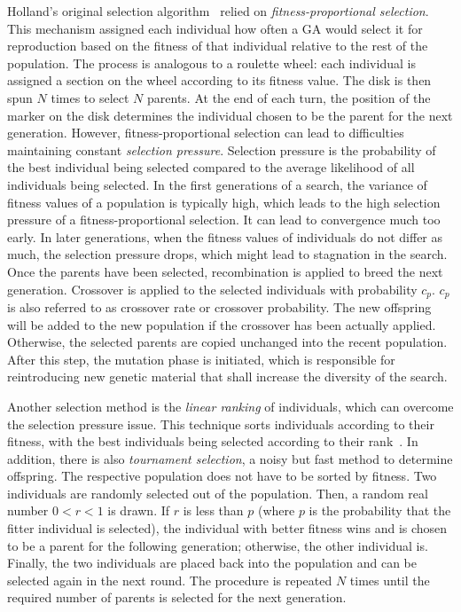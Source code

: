 \documentclass[paper=a4,%
  twoside,%
  BCOR4mm,%
  abstract=true,%
  toc=bibliography,%
  chapterprefix=true,%
  toc=bibliographynumbered,%
  open=right,%
  english,%
  pagesize=pdftex]{scrreprt}
\newcommand{\todo}[1]{\textbf{TODO: #1}}
\begin{document}
Holland's original selection algorithm~\cite{Holland1992} relied on \emph{fitness-proportional selection}. This mechanism assigned each individual how often a \ac{GA} would select it for reproduction based on the fitness of that individual relative to the rest of the population. The process is analogous to a roulette wheel: each individual is assigned a section on the wheel according to its fitness value. The disk is then spun $N$ times to select $N$ parents. At the end of each turn, the position of the marker on the disk determines the individual chosen to be the parent for the next generation. However, fitness-proportional selection can lead to difficulties maintaining constant \emph{selection pressure}. Selection pressure is the probability of the best individual being selected compared to the average likelihood of all individuals being selected. In the first generations of a search, the variance of fitness values of a population is typically high, which leads to the high selection pressure of a fitness-proportional selection. It can lead to convergence much too early. In later generations, when the fitness values of individuals do not differ as much, the selection pressure drops, which might lead to stagnation in the search. Once the parents have been selected, recombination is applied to breed the next generation. Crossover is applied to the selected individuals with probability $c_p$. $c_p$ is also referred to as crossover rate or crossover probability. The new offspring will be added to the new population if the crossover has been actually applied. Otherwise, the selected parents are copied unchanged into the recent population. After this step, the mutation phase is initiated, which is responsible for reintroducing new genetic material that shall increase the diversity of the search.

Another selection method is the \emph{linear ranking} of individuals, which can overcome the selection pressure issue. This technique sorts individuals according to their fitness, with the best individuals being selected according to their rank~\cite{whitley1989genitor}. In addition, there is also \emph{tournament selection}, a noisy but fast method to determine offspring. The respective population does not have to be sorted by fitness. Two individuals are randomly selected out of the population. Then, a random real number $0 < r < 1$ is drawn. If $r$ is less than $p$ (where $p$ is the probability that the fitter individual is selected), the individual with better fitness wins and is chosen to be a parent for the following generation; otherwise, the other individual is. Finally, the two individuals are placed back into the population and can be selected again in the next round. The procedure is repeated $N$ times until the required number of parents is selected for the next generation. %
\end{document}
